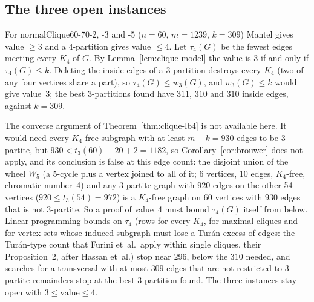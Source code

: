 \subsection{The three open instances}

For normalClique60-70-2, -3 and -5 ($n=60$, $m=1239$, $k=309$) Mantel gives
value $\ge 3$ and a 4-partition gives value $\le 4$. Let $\tau_4(G)$ be the
fewest edges meeting every $K_4$ of $G$. By Lemma~\ref{lem:clique-model} the
value is $3$ if and only if $\tau_4(G)\le k$. Deleting the inside edges of a
3-partition destroys every $K_4$ (two of any four vertices share a part), so
$\tau_4(G)\le w_3(G)$, and $w_3(G)\le k$ would give value~$3$; the best
3-partitions found have $311$, $310$ and $310$ inside edges, against $k=309$.

The converse argument of Theorem~\ref{thm:clique-lb4} is not available
here. It would need every $K_4$-free subgraph with at least $m-k=930$ edges
to be 3-partite, but $930<t_3(60)-20+2=1182$, so Corollary~\ref{cor:brouwer}
does not apply, and its conclusion is false at this edge count: the disjoint
union of the wheel $W_5$ (a 5-cycle plus a vertex joined to all of it; 6
vertices, 10 edges, $K_4$-free, chromatic number~4) and any 3-partite graph
with $920$ edges on the other 54 vertices ($920\le t_3(54)=972$) is a
$K_4$-free graph on 60 vertices with 930 edges that is not 3-partite. So a
proof of value~4 must bound $\tau_4(G)$ itself from below. Linear
programming bounds on $\tau_4$ (rows for every $K_4$, for maximal cliques and
for vertex sets whose induced subgraph must lose a Tur\'an excess of edges:
the Tur\'an-type count that Furini et~al.\ apply within single cliques, their
Proposition~2,\cite{furini2021branch} after Hassan
et~al.\cite{hassan2018clique}) stop near $296$, below the $310$ needed, and
searches for a transversal with
at most $309$ edges that are not restricted to 3-partite remainders stop at
the best 3-partition found. The three instances stay open with
$3\le\text{value}\le 4$.
